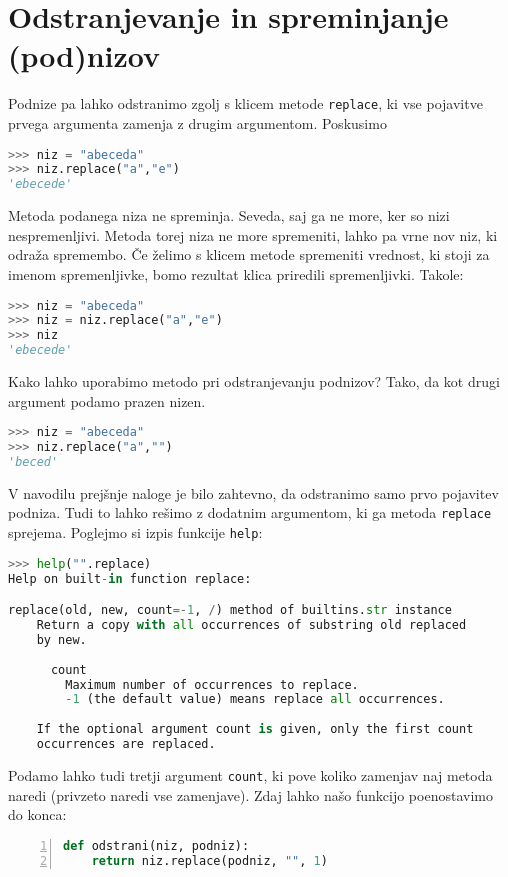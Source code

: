 \section{Odstranjevanje in spreminjanje (pod)nizov}
Podnize pa lahko odstranimo zgolj s klicem metode \texttt{replace}, ki vse pojavitve prvega argumenta zamenja z drugim argumentom. Poskusimo
\begin{lstlisting}[language=Python, showstringspaces=false]
>>> niz = "abeceda"
>>> niz.replace("a","e")
'ebecede'
\end{lstlisting}
Metoda podanega niza ne spreminja. Seveda, saj ga ne more, ker so nizi nespremenljivi. Metoda torej niza ne more spremeniti, lahko pa vrne nov niz, ki odraža spremembo. Če želimo s klicem metode spremeniti vrednost, ki stoji za imenom spremenljivke, bomo rezultat klica priredili spremenljivki. Takole:
\begin{lstlisting}[language=Python, showstringspaces=false]
>>> niz = "abeceda"
>>> niz = niz.replace("a","e")
>>> niz
'ebecede'
\end{lstlisting}
Kako lahko uporabimo metodo pri odstranjevanju podnizov? Tako, da kot drugi argument podamo prazen nizen.
\begin{lstlisting}[language=Python, showstringspaces=false]
>>> niz = "abeceda"
>>> niz.replace("a","")
'beced'
\end{lstlisting}
V navodilu prejšnje naloge je bilo zahtevno, da odstranimo samo prvo pojavitev podniza. Tudi to lahko rešimo z dodatnim argumentom, ki ga metoda \texttt{replace} sprejema. Poglejmo si izpis funkcije \texttt{help}:
\begin{lstlisting}[language=Python, showstringspaces=false]
>>> help("".replace)
Help on built-in function replace:

replace(old, new, count=-1, /) method of builtins.str instance
    Return a copy with all occurrences of substring old replaced
    by new.
    
      count
        Maximum number of occurrences to replace.
        -1 (the default value) means replace all occurrences.
    
    If the optional argument count is given, only the first count 
    occurrences are replaced.
\end{lstlisting}
Podamo lahko tudi tretji argument \texttt{count}, ki pove koliko zamenjav naj metoda naredi (privzeto naredi vse zamenjave). Zdaj lahko našo funkcijo poenostavimo do konca:
\begin{lstlisting}[language=Python, showstringspaces=false,numbers=left]
def odstrani(niz, podniz):
    return niz.replace(podniz, "", 1)
\end{lstlisting}

